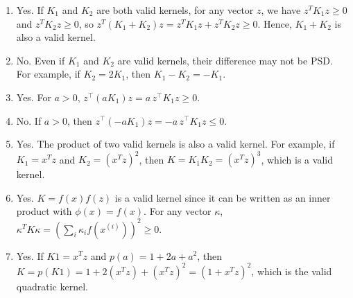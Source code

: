 \begin{answer}

\begin{enumerate}[label=(\alph*)]
    \item Yes. If $K_1$ and $K_2$ are both valid kernels, for any vector $z$, we have $z^T K_1 z \geq 0$ and $z^T K_2 z \geq 0$, so
    $z^T (K_1 + K_2) z = z^T K_1 z + z^T K_2 z \geq 0$.
    Hence, $K_1 + K_2$ is also a valid kernel.

    \item No. Even if $K_1$ and $K_2$ are valid kernels, their difference may not be PSD.
    For example, if $K_2 = 2K_1$, then $K_1 - K_2 = -K_1$.

    \item Yes. For $a>0$, $z^\top (aK_1) z = a \, z^\top K_1 z \ge 0$.

    \item No. If $a>0$, then $z^\top (-aK_1) z = -a \, z^\top K_1 z \le 0$.
    
    \item Yes. The product of two valid kernels is also a valid kernel.
    For example, if $K_1 = x^T z$ and $K_2 = (x^T z)^2$, then
    $K = K_1K_2 = (x^T z)^3$, which is a valid kernel.

    \item Yes. $K=f(x)f(z)$ is a valid kernel since it can be written as an inner product
    with $\phi(x)=f(x)$. For any vector $\kappa$, $\kappa^T K \kappa = (\sum_i \kappa_i f(x^{(i)}))^2 \geq 0$.

    \item Yes. If $K1​=x^Tz$ and $p(a)=1+2a+a^2$, then $K=p(K1​)=1+2(x^Tz)+(x^Tz)^2=(1+x^Tz)^2$,
    which is the valid quadratic kernel.
\end{enumerate}

\end{answer}
